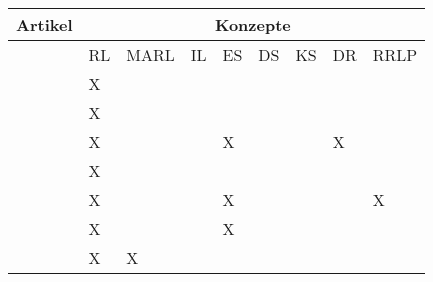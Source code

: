 \begin{longtable}{|l|llllllll|}
    \hline
    \multicolumn{1}{|c|}{Artikel} & \multicolumn{8}{c|}{Konzepte}                                                                                                                                                                \\ \hline
    \endhead
                                  & \multicolumn{1}{l|}{RL} & \multicolumn{1}{l|}{MARL} & \multicolumn{1}{l|}{IL} & \multicolumn{1}{l|}{ES} & \multicolumn{1}{l|}{DS} & \multicolumn{1}{l|}{KS} & \multicolumn{1}{l|}{DR} & \multicolumn{1}{l|}{RRLP}  \\ \hline
    \cite[]{Sutton.2018}          & \multicolumn{1}{l|}{X}   & \multicolumn{1}{l|}{}     & \multicolumn{1}{l|}{}   & \multicolumn{1}{l|}{}   & \multicolumn{1}{l|}{}   & \multicolumn{1}{l|}{}   & \multicolumn{1}{l|}{}   & \multicolumn{1}{l|}{}      \\ \hline
    \cite[]{Li.2019}              & \multicolumn{1}{l|}{X}   & \multicolumn{1}{l|}{}     & \multicolumn{1}{l|}{}   & \multicolumn{1}{l|}{}   & \multicolumn{1}{l|}{}   & \multicolumn{1}{l|}{}   & \multicolumn{1}{l|}{}   & \multicolumn{1}{l|}{}      \\ \hline
    \cite[]{Zhao.2020}            & \multicolumn{1}{l|}{X}   & \multicolumn{1}{l|}{}     & \multicolumn{1}{l|}{}  & \multicolumn{1}{l|}{X}   & \multicolumn{1}{l|}{}   & \multicolumn{1}{l|}{}   & \multicolumn{1}{l|}{X}   & \multicolumn{1}{l|}{}      \\ \hline
    \cite[]{Wang.2020}            & \multicolumn{1}{l|}{X}   & \multicolumn{1}{l|}{}     & \multicolumn{1}{l|}{}   & \multicolumn{1}{l|}{}   & \multicolumn{1}{l|}{}   & \multicolumn{1}{l|}{}   & \multicolumn{1}{l|}{}   & \multicolumn{1}{l|}{}      \\ \hline
    \cite[]{Zhang.2018}           & \multicolumn{1}{l|}{X}   & \multicolumn{1}{l|}{}     & \multicolumn{1}{l|}{}  & \multicolumn{1}{l|}{X}   & \multicolumn{1}{l|}{}   & \multicolumn{1}{l|}{}   & \multicolumn{1}{l|}{}   & \multicolumn{1}{l|}{X}      \\ \hline
    \cite[]{Cutler.2014}          & \multicolumn{1}{l|}{X}   & \multicolumn{1}{l|}{}     & \multicolumn{1}{l|}{}  & \multicolumn{1}{l|}{X}   & \multicolumn{1}{l|}{}   & \multicolumn{1}{l|}{}   & \multicolumn{1}{l|}{}   & \multicolumn{1}{l|}{}      \\ \hline
    \cite[]{Canese.2021}          & \multicolumn{1}{l|}{X}   & \multicolumn{1}{l|}{X}    & \multicolumn{1}{l|}{}   & \multicolumn{1}{l|}{}   & \multicolumn{1}{l|}{}   & \multicolumn{1}{l|}{}   & \multicolumn{1}{l|}{}   & \multicolumn{1}{l|}{}      \\ \hline

\end{longtable}
